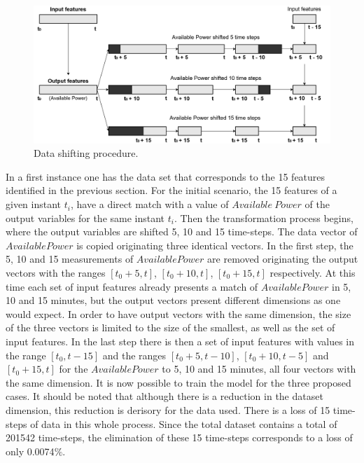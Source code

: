 \begin{figure}[h!]
    \centering
    \begin{center}
    \includegraphics[width=1\textwidth]{Images/Data Shift.png}
    \caption{Data shifting procedure.}
    \label{shifting}
    \end{center}
\end{figure}

In a first instance one has the data set that corresponds to the 15 features identified in the previous section. For the initial scenario, the 15 features of a given instant $t_i$, have a direct match with a value of $Available\ Power$ of the output variables for the same instant $t_i$.  Then the transformation process begins, where the output variables are shifted 5, 10 and 15 time-steps. The data vector of $Available Power$ is copied originating three identical vectors. In the first step, the 5, 10 and 15 measurements of $Available Power$ are removed originating the output vectors with the ranges $[t_0 + 5, t]$, $[t_0 + 10, t]$, $[t_0 + 15, t]$ respectively.  At this time each set of input features already presents a match of $Available Power$ in 5, 10 and 15 minutes, but the output vectors present different dimensions as one would expect. In order to have output vectors with the same dimension, the size of the three vectors is limited to the size of the smallest, as well as the set of input features. In the last step there is then a set of input features with values in the range $[t_0, t-15]$ and the ranges $[t_0 + 5, t-10]$, $[t_0 + 10, t-5]$ and $[t_0 + 15, t]$ for the $Available Power$ to 5, 10 and 15 minutes, all four vectors with the same dimension. It is now possible to train the model for the three proposed cases. It should be noted that although there is a reduction in the dataset dimension, this reduction is derisory for the data used. There is a loss of 15 time-steps of data in this whole process. Since the total dataset contains a total of 201542 time-steps, the elimination of these 15 time-steps corresponds to a loss of only 0.0074$\%$.

